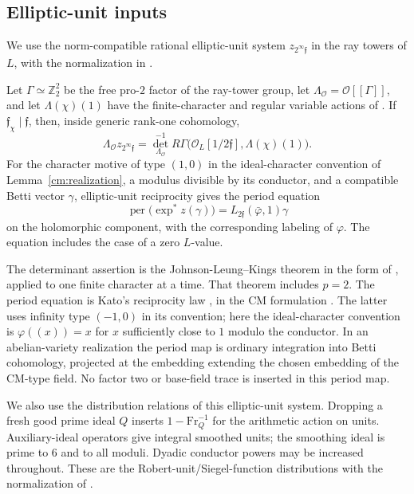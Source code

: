 \subsection{Elliptic-unit inputs}

We use the norm-compatible rational elliptic-unit system
\(z_{2^\infty\mathfrak f}\) in the ray towers of \(L\), with the
normalization in \cite[Sections~3--4]{BF23}.

\begin{theorem}
\label{cm:external-units}
Let \(\Gamma\simeq\mathbb Z_2^2\) be the free pro-\(2\) factor of the ray-tower group,
let \(\Lambda_{\mathcal O}=\mathcal O[[\Gamma]]\), and let
\(\Lambda(\chi)(1)\) have the finite-character and regular variable
actions of \cite[Section~4.1]{BF23}. If
\(\mathfrak f_\chi\mid\mathfrak f\), then, inside generic
rank-one cohomology,
\[
 \Lambda_{\mathcal O}z_{2^\infty\mathfrak f}
 =
 \det_{\Lambda_{\mathcal O}}^{-1}
 R\Gamma\bigl(\mathcal O_L[1/2\mathfrak f],\Lambda(\chi)(1)\bigr).
\]
For the character motive of type \((1,0)\) in the ideal-character
convention of Lemma~\ref{cm:realization}, a modulus divisible by its
conductor, and a compatible Betti vector \(\gamma\), elliptic-unit
reciprocity gives the period equation
\[
 \operatorname{per}\bigl(\exp^*z(\gamma)\bigr)
       =L_{2\mathfrak f}(\bar\varphi,1)\gamma
\]
on the holomorphic component, with the corresponding labeling of
\(\varphi\). The equation includes the case of a zero \(L\)-value.
\end{theorem}

The determinant assertion is the Johnson-Leung--Kings theorem in the
form of \cite[Theorem~4.1]{BF23}, applied to one finite character at a
time. That theorem includes \(p=2\).
The period equation is Kato's reciprocity law
\cite[Proposition~15.9]{Kato04}, in the CM formulation
\cite[Proposition~3.1]{BF23}. The latter uses infinity type
\((-1,0)\) in its convention; here the ideal-character convention is
\(\varphi((x))=x\) for \(x\) sufficiently close to \(1\) modulo the
conductor. In an abelian-variety realization the period map is ordinary
integration into Betti cohomology, projected at the embedding extending
the chosen embedding of the CM-type field. No factor two or base-field
trace is inserted in this period map.

We also use the distribution relations of this elliptic-unit system.
Dropping a fresh good prime ideal \(Q\) inserts
\(1-\mathrm{Fr}_Q^{-1}\) for the arithmetic action on units.
Auxiliary-ideal operators give integral smoothed units; the smoothing
ideal is prime to \(6\) and to all moduli. Dyadic conductor powers may
be increased throughout. These are the Robert-unit/Siegel-function
distributions with the normalization of
\cite[Sections~3.2 and~4.1]{BF23}.

